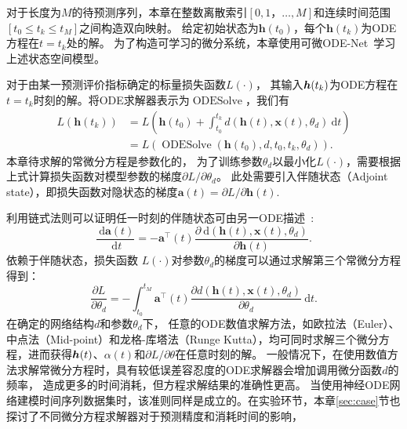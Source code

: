 对于长度为$M$的待预测序列，本章在整数离散索引$[0,1，\dots,M]$和连续时间范围$[t_0\leq t_k \leq t_{M}]$之间构造双向映射。
给定初始状态为$\boldsymbol{h}(t_0)$，每个$\boldsymbol{h}(t_k)$为ODE方程在$t=t_k$处的解。
为了构造可学习的微分系统，本章使用可微ODE-Net~\cite{chen2018neural}学习上述状态空间模型。

对于由某一预测评价指标确定的标量损失函数$L(\cdot)$，
其输入$\boldsymbol{h}(t_k)$为ODE方程在$t=t_k$时刻的解。将ODE求解器表示为$\operatorname{ODESolve}$，我们有
\begin{align}
\label{equ:loss_ode_solver}
L\left(\boldsymbol{h}\left(t_{k}\right)\right)&=L\left(\boldsymbol{h}\left(t_{0}\right)+\int_{t_{0}}^{t_{k}} d(\boldsymbol{h}(t), \boldsymbol x(t), \theta_d) \mathrm{~d} t\right)\nonumber\\
&=L\left(\operatorname{ODESolve}\left(\boldsymbol{h}\left(t_{0}\right), d, t_{0}, t_{k}, \theta_d \right)\right).
\end{align}
本章待求解的常微分方程是参数化的，
为了训练参数$\theta _d$以最小化$L(\cdot)$，需要根据上式计算损失函数对模型参数的梯度$\partial L / \partial \theta _d$。
此处需要引入伴随状态（Adjoint state），即损失函数对隐状态的梯度$\boldsymbol{a}(t)=\partial L / \partial \boldsymbol{h}(t)$.

利用链式法则可以证明任一时刻的伴随状态可由另一ODE描述~\cite{chen2018neural}:
\begin{equation}
\label{equ:ode_at}
\frac{\mathrm{~d} \boldsymbol{a}(t)}{\mathrm{~d} t}=-\boldsymbol{a}^{\top}(t) \frac{\partial \mathrm{~d}(\boldsymbol{h}(t), \boldsymbol x(t), \theta_d)}{\partial \boldsymbol{h}(t)}.
\end{equation}
依赖于伴随状态，损失函数 $L(\cdot)$对参数$\theta _d$的梯度可以通过求解第三个常微分方程得到：
\begin{equation}
\label{equ:grad_ode}
\frac{\partial L}{\partial \theta _d}=-\int_{t_0}^{t_{M}} \boldsymbol{a}^{\top}(t) \frac{\partial d(\boldsymbol{h}(t), \boldsymbol x(t), \theta _d)}{\partial \theta_d} \mathrm{~d} t.
\end{equation}
在确定的网络结构$d$和参数$\theta _d$下，
任意的ODE数值求解方法，如欧拉法（Euler）、中点法（Mid-point）和龙格-库塔法（Runge Kutta），均可同时求解三个微分方程，进而获得$\boldsymbol h (t)$、$\alpha (t)$和${\partial L}/{\partial \theta}$在任意时刻的解。
一般情况下，在使用数值方法求解常微分方程时，具有较低误差容忍度的ODE求解器会增加调用微分函数$d$的频率，
造成更多的时间消耗，但方程求解结果的准确性更高。
当使用神经ODE网络建模时间序列数据集时，该准则同样是成立的。在实验环节，本章\ref{sec:case}节也探讨了不同微分方程求解器对于预测精度和消耗时间的影响，

